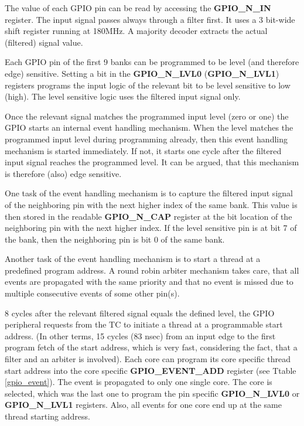 The value of each GPIO pin can be read by accessing the \textbf{GPIO\_N\_IN} register. The input signal passes always through a filter first. It uses a 3 bit-wide shift register running at 180MHz. A majority decoder extracts the actual (filtered) signal value.

Each GPIO pin of the first 9 banks can be programmed to be level (and therefore edge) sensitive. Setting a bit in the \textbf{GPIO\_N\_LVL0} (\textbf{GPIO\_N\_LVL1}) registers programs the input logic of the relevant bit to be level sensitive to low (high). The level sensitive logic uses the filtered input signal only.

Once the relevant signal matches the programmed input level (zero or one) the GPIO starts an internal event handling mechanism. When the level matches the programmed input level during programming already, then this event handling mechanism is started immediately. If not, it starts one cycle after the filtered input signal reaches the programmed level. It can be argued, that this mechanism is therefore (also) edge sensitive.

One task of the event handling mechanism is to capture the filtered input signal of the neighboring pin with the next higher index of the same bank. This value is then stored in the readable \textbf{GPIO\_N\_CAP} register at the bit location of the neighboring pin with the next higher index. If the level sensitive pin is at bit 7 of the bank, then the neighboring pin is bit 0 of the same bank.

Another task of the event handling mechanism is to start a thread at a predefined program address. A round robin arbiter mechanism takes care, that all events are propagated with the same priority and that no event is missed due to multiple consecutive events of some other pin(s).

8 cycles after the relevant filtered signal equals the defined level, the GPIO peripheral requests from the TC to initiate a thread at a programmable start address. (In other terms, 15 cycles (83 nsec) from an input edge to the first program fetch of the start address, which is very fast, considering the fact, that a filter and an arbiter is involved). Each core can program its core specific thread start address into the core specific \textbf{GPIO\_EVENT\_ADD} register (see Ttable \ref{gpio_event}). The event is propagated to only one single core. The core is selected, which was the last one to program the pin specific \textbf{GPIO\_N\_LVL0} or \textbf{GPIO\_N\_LVL1} registers. Also, all events for one core end up at the same thread starting address. 

